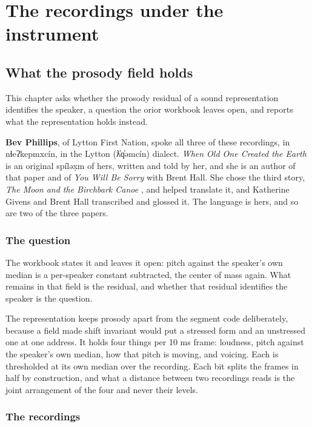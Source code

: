 \chapter{The recordings under the instrument}

\section{What the prosody field holds}

This chapter asks whether the prosody residual of a sound representation identifies the speaker, a
question the orior workbook \cite{src:Quigg-orior-workbook} leaves open, and reports what the
representation holds instead.

\textbf{Bev Phillips}, of Lytton First Nation, spoke all three of these recordings, in
nɬeʔkepmxcín, in the Lytton (ƛ̓q̓əmcín) dialect. \emph{When Old One Created the Earth}
\cite{src:Hall-and-Phillips-2025} is an original spíləx̣m of hers, written and told by her, and she
is an author of that paper and of \emph{You Will Be Sorry} \cite{src:Hall-and-Phillips-2024} with
Brent Hall. She chose the third story, \emph{The Moon and the Birchbark Canoe}
\cite{src:Givens-and-Hall-2023}, and helped translate it, and Katherine Givens and Brent Hall
transcribed and glossed it. The language is hers, and so are two of the three papers.

\subsection{The question}

The workbook states it and leaves it open: pitch against the speaker's own median is a per-speaker
constant subtracted, the center of mass again. What remains in that field is the residual, and
whether that residual identifies the speaker is the question.

The representation keeps prosody apart from the segment code deliberately, because a field made
shift invariant would put a stressed form and an unstressed one at one address. It holds four things
per 10 ms frame: loudness, pitch against the speaker's own median, how that pitch is moving, and
voicing. Each is thresholded at its own median over the recording. Each bit splits the frames in
half by construction, and what a distance between two recordings reads is the joint arrangement of
the four and never their levels.

\subsection{The recordings}

